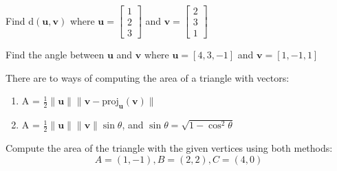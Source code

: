 \documentclass[11pt,letterpaper,boxed]{hmcpset}
\begin{document}

\begin{problem}[\#15] 
Find d$(\textbf{u},\textbf{v})$ where $\textbf{u} = \begin{bmatrix} 1 \\ 2 \\ 3 \end{bmatrix}$ and $\textbf{v} = \begin{bmatrix} 2 \\ 3 \\ 1 \end{bmatrix}$
\end{problem}



\pagebreak


\begin{problem}[\#26] 
Find the angle between $\textbf{u}$ and $\textbf{v}$ where $\textbf{u} = [4, 3, -1]$ and $\textbf{v} = [1, -1, 1]$
\end{problem}



\pagebreak


\begin{problem}[\#46] 
There are to ways of computing the area of a triangle with vectors:

\begin{enumerate}
\item A = $\frac{1}{2} \| \textbf{u}\| \|\textbf{v}-\text{proj}_\textbf{u} (\textbf{v})\|$
\item A = $\frac{1}{2} \| \textbf{u}\| \|\textbf{v}\| \sin{\theta}$, and $\sin{\theta} = \sqrt{1 - \cos^2{\theta}}$
\end{enumerate}

Compute the area of the triangle with the given vertices using both methods:
\[
A = (1, - 1), B = (2, 2), C = (4, 0)
\]
\end{problem}
\end{document}
